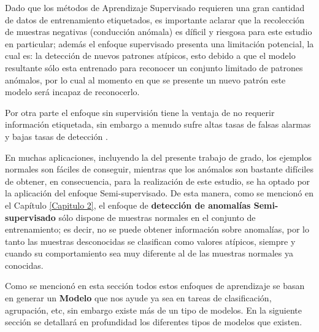 \vspace{5mm} %

Dado que los m\'{e}todos de Aprendizaje Supervisado requieren una gran cantidad de datos de entrenamiento etiquetados, es importante aclarar que la recolecci\'{o}n de muestras negativas (conducci\'{o}n an\'{o}mala) es d\'{i}ficil y riesgosa para este estudio en particular; adem\'{a}s el enfoque supervisado presenta una limitaci\'{o}n potencial, la cual es: la detecci\'{o}n de nuevos patrones at\'{i}picos, esto debido a que el modelo resultante s\'{o}lo esta entrenado para reconocer un conjunto limitado de patrones an\'{o}malos, por lo cual al momento en que se presente un nuevo patr\'{o}n este modelo ser\'{a} incapaz de reconocerlo.

\vspace{5mm} %

Por otra parte el enfoque sin supervisi\'{o}n tiene la ventaja de no requerir informaci\'{o}n etiquetada, sin embargo a menudo sufre altas tasas de falsas alarmas y bajas tasas de detecci\'{o}n \cite{33}. 

\vspace{5mm} %

En muchas aplicaciones, incluyendo la del presente trabajo de grado, los ejemplos normales son f\'{a}ciles de conseguir, mientras que los an\'{o}malos son bastante dif\'{i}ciles de obtener, en consecuencia, para la realizaci\'{o}n de este estudio, se ha optado por la aplicaci\'{o}n del enfoque Semi-supervisado. De esta manera, como se mencion\'{o} en el Cap\'{i}tulo \ref{Capitulo 2}, el enfoque de \textbf{detecci\'{o}n de anomal\'{i}as Semi-supervisado} s\'{o}lo dispone de muestras normales en el conjunto de entrenamiento; es decir, no se puede obtener informaci\'{o}n sobre anomal\'{i}as, por lo tanto las muestras desconocidas se clasifican como valores at\'{i}picos, siempre y cuando su comportamiento sea muy diferente al de las muestras normales ya conocidas.


\vspace{5mm} %

Como se mencion\'{o} en esta secci\'{o}n todos estos enfoques de aprendizaje se basan en generar un \textbf{Modelo} que nos ayude ya sea en tareas de clasificaci\'{o}n, agrupaci\'{o}n, etc, sin embargo existe m\'{a}s de un tipo de modelos. En la siguiente secci\'{o}n se detallar\'{a} en profundidad los diferentes tipos de modelos que existen.

